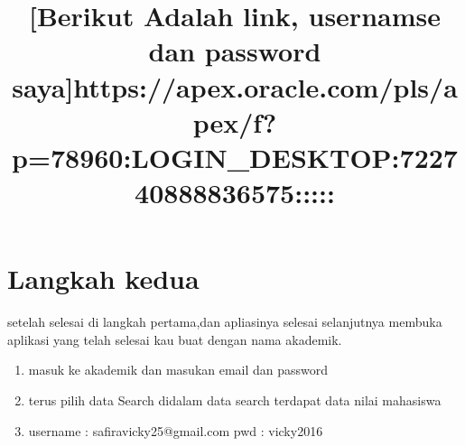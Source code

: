 \section{Langkah kedua}
setelah selesai di langkah pertama,dan apliasinya selesai selanjutnya membuka aplikasi yang telah selesai kau buat dengan nama akademik.
\begin{enumerate}
    \item masuk ke akademik dan masukan email dan password
    \item terus pilih data Search
didalam data search terdapat data nilai mahasiswa 
    \title{[Berikut Adalah link, usernamse dan password saya]} 
    \title{https://apex.oracle.com/pls/apex/f?p=78960:LOGIN_DESKTOP:722740888836575:::::}
    \item username : safiravicky25@gmail.com pwd : vicky2016
\end{enumerate}

